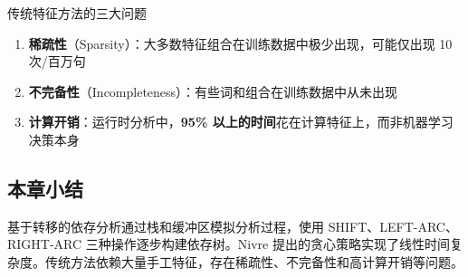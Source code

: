 \begin{warningbox}{传统特征方法的三大问题}
\begin{enumerate}
    \item \textbf{稀疏性}（Sparsity）：大多数特征组合在训练数据中极少出现，可能仅出现 10 次/百万句
    \item \textbf{不完备性}（Incompleteness）：有些词和组合在训练数据中从未出现
    \item \textbf{计算开销}：运行时分析中，\textbf{95\% 以上的时间}花在计算特征上，而非机器学习决策本身
\end{enumerate}
\end{warningbox}

\subsection{本章小结}

基于转移的依存分析通过栈和缓冲区模拟分析过程，使用 SHIFT、LEFT-ARC、RIGHT-ARC 三种操作逐步构建依存树。Nivre 提出的贪心策略实现了线性时间复杂度。传统方法依赖大量手工特征，存在稀疏性、不完备性和高计算开销等问题。



